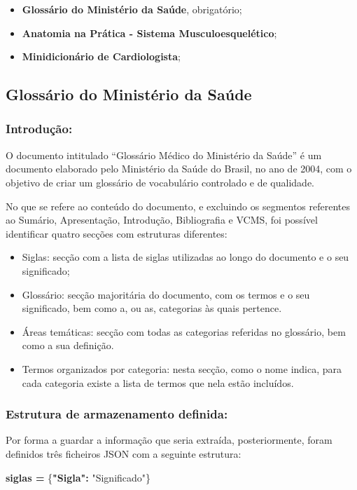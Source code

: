 \begin{itemize}
    \item \textbf{Glossário do Ministério da Saúde}, obrigatório;
    \item \textbf{Anatomia na Prática - Sistema Musculoesquelético};
    \item \textbf{Minidicionário de Cardiologista};
\end{itemize}

\subsection{Glossário do Ministério da Saúde}

\subsubsection{Introdução:}
O documento intitulado “Glossário Médico do Ministério da Saúde” é um documento elaborado pelo Ministério da Saúde do Brasil, no ano de 2004, com o objetivo de criar um glossário de vocabulário controlado e de qualidade. 

No que se refere ao conteúdo do documento, e excluindo os segmentos referentes ao Sumário, Apresentação, Introdução, Bibliografia e VCMS, foi possível identificar quatro secções com estruturas diferentes:
\begin{itemize}
    \item Siglas: secção com a lista de siglas utilizadas ao longo do documento e o seu significado;
	\item Glossário: secção majoritária do documento, com os termos e o seu significado, bem como a, ou as, categorias às quais pertence.
	\item Áreas temáticas: secção com todas as categorias referidas no glossário, bem como a sua definição.
	\item Termos organizados por categoria: nesta secção, como o nome indica, para cada categoria existe a lista de termos que nela estão incluídos.
\end{itemize}

\subsubsection{Estrutura de armazenamento definida:}
Por forma a guardar a informação que seria extraída, posteriormente, foram definidos três ficheiros JSON com a seguinte estrutura:

\begin{center}
    \textbf{siglas =}
    \{\textbf{"Sigla":}
    "Significado"\}
\end{center}



